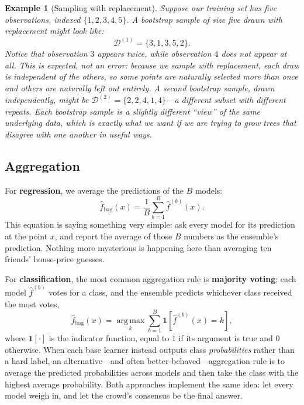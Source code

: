 \documentclass[12pt,a4paper]{article}
\newtheorem{example}{Example}[section]
\begin{document}
\begin{example}[Sampling with replacement]
\label{ex:bootstrap}
Suppose our training set has five observations, indexed $\{1, 2, 3, 4, 5\}$. A bootstrap sample of size five drawn with replacement might look like:
$$
\mathcal{D}^{(1)} = \{3, 1, 3, 5, 2\}.
$$
Notice that observation $3$ appears twice, while observation $4$ does not appear at all. This is expected, not an error: because we sample with replacement, each draw is independent of the others, so some points are naturally selected more than once and others are naturally left out entirely. A second bootstrap sample, drawn independently, might be $\mathcal{D}^{(2)} = \{2, 2, 4, 1, 4\}$---a different subset with different repeats. Each bootstrap sample is a slightly different ``view'' of the same underlying data, which is exactly what we want if we are trying to grow trees that disagree with one another in useful ways.
\end{example}

\subsection{Aggregation}

For \textbf{regression}, we average the predictions of the $B$ models:
\begin{equation}
\label{eq:bagging-regression}
\hat f_{\text{bag}}(x) = \frac{1}{B} \sum_{b=1}^{B} \hat f^{(b)}(x).
\end{equation}
This equation is saying something very simple: ask every model for its prediction at the point $x$, and report the average of those $B$ numbers as the ensemble's prediction. Nothing more mysterious is happening here than averaging ten friends' house-price guesses.

For \textbf{classification}, the most common aggregation rule is \textbf{majority voting}: each model $\hat f^{(b)}$ votes for a class, and the ensemble predicts whichever class received the most votes,
\begin{equation}
\label{eq:bagging-classification}
\hat f_{\text{bag}}(x) = \operatorname*{arg\,max}_{k} \sum_{b=1}^{B} \mathbf{1}\!\left[\hat f^{(b)}(x) = k\right],
\end{equation}
where $\mathbf{1}[\cdot]$ is the indicator function, equal to $1$ if its argument is true and $0$ otherwise. When each base learner instead outputs class \emph{probabilities} rather than a hard label, an alternative---and often better-behaved---aggregation rule is to average the predicted probabilities across models and then take the class with the highest average probability. Both approaches implement the same idea: let every model weigh in, and let the crowd's consensus be the final answer.
\end{document}
